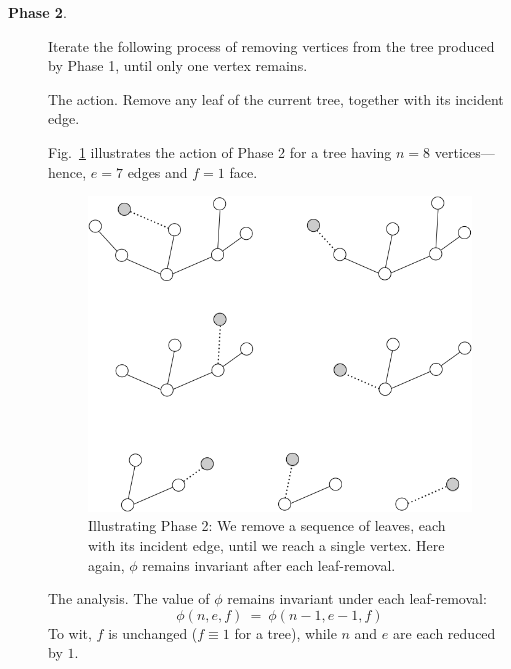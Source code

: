 \begin{description}
\item[{\bf Phase 2}.]
Iterate the following process of removing vertices from the tree produced by Phase 1, until only one vertex remains.

\medskip

{\sf The action}.
Remove any leaf of the current tree, together with its incident edge.

\smallskip

Fig.~\ref{fig:planarStep2} illustrates the action of Phase  2 for a tree having $n=8$ vertices---hence, $e=7$ edges and $f=1$ face.
\begin{figure}[hbt]
\begin{center}
   \includegraphics[scale=0.35]{FiguresGraph/planarStep2}
 \caption{Illustrating Phase 2: We remove a sequence of leaves, each with its incident edge, until we reach a single vertex.  Here again, $\phi$ remains invariant after each leaf-removal.}
  \label{fig:planarStep2}
\end{center}
\end{figure}

\medskip

{\sf The analysis}.
The value of $\phi$ remains invariant under each leaf-removal:
\[ \phi(n,e,f) \ = \ \phi(n-1,e-1,f) \]
To wit, $f$ is unchanged ($f \equiv 1$ for a tree), while $n$ and $e$ are each reduced by $1$.
\end{description}

\medskip

